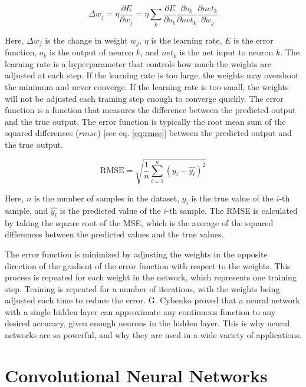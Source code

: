 \begin{equation} \label{eq:backprop}
    \Delta w_j = \eta \frac{\partial E}{\partial w_j} = \eta \sum_{k} \frac{\partial E}{\partial o_k} \frac{\partial o_k}{\partial net_k} \frac{\partial net_k}{\partial w_j}
\end{equation}

Here, $\Delta w_j$ is the change in weight $w_j$, $\eta$ is the learning rate, $E$ is the error function, $o_k$ is the output of neuron $k$, and $net_k$ is the net input to neuron $k$. The learning rate is a hyperparameter that controls how much the weights are adjusted at each step. If the learning rate is too large, the weights may overshoot the minimum and never converge. If the learning rate is too small, the weights will not be adjusted each training step enough to converge quickly. The error function is a function that measures the difference between the predicted output and the true output. The error function is typically the root mean sum of the squared differences ($rmse$) [see eq. \ref{eq:rmse}] between the predicted output and the true output.

\begin{equation} \label{eq:rmse}
    \text{RMSE} = \sqrt{\frac{1}{n} \sum_{i=1}^n (y_i - \hat{y_i})^2}
\end{equation}

Here, $n$ is the number of samples in the dataset, $y_i$ is the true value of the $i$-th sample, and $\hat{y_i}$ is the predicted value of the $i$-th sample. The RMSE is calculated by taking the square root of the MSE, which is the average of the squared differences between the predicted values and the true values.

The error function is minimized by adjusting the weights in the opposite direction of the gradient of the error function with respect to the weights. This process is repeated for each weight in the network, which represents one training step. Training is repeated for a number of iterations, with the weights being adjusted each time to reduce the error. G. Cybenko proved that a neural network with a single hidden layer can approximate any continuous function to any desired accuracy, given enough neurons in the hidden layer. This is why neural networks are so powerful, and why they are used in a wide variety of applications.


\section{Convolutional Neural Networks}

